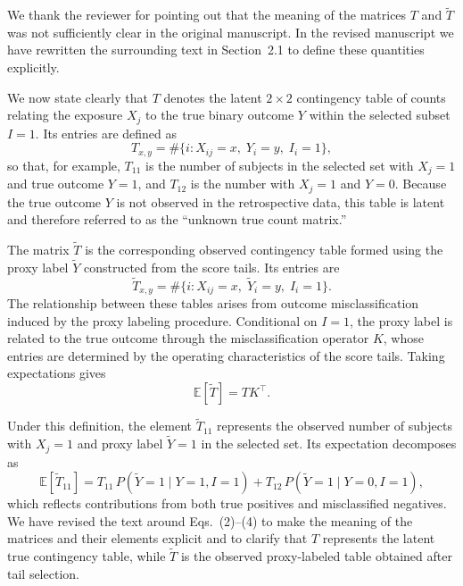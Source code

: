 \documentclass[onecolumn,11pt]{IEEEtran}
\begin{document}
We thank the reviewer for pointing out that the meaning of the matrices $T$ and $\tilde{T}$ was not sufficiently clear in the original manuscript. In the revised manuscript we have rewritten the surrounding text in Section~2.1 to define these quantities explicitly.

We now state clearly that $T$ denotes the latent $2\times2$ contingency table of counts relating the exposure $X_j$ to the true binary outcome $Y$ within the selected subset $I=1$. Its entries are defined as
\[
T_{x,y} = \#\{i : X_{ij}=x,\; Y_i=y,\; I_i=1\},
\]
so that, for example, $T_{11}$ is the number of subjects in the selected set with $X_j=1$ and true outcome $Y=1$, and $T_{12}$ is the number with $X_j=1$ and $Y=0$. Because the true outcome $Y$ is not observed in the retrospective data, this table is latent and therefore referred to as the ``unknown true count matrix.''

The matrix $\tilde{T}$ is the corresponding observed contingency table formed using the proxy label $\tilde{Y}$ constructed from the score tails. Its entries are
\[
\tilde{T}_{x,y} = \#\{i : X_{ij}=x,\; \tilde{Y}_i=y,\; I_i=1\}.
\]
The relationship between these tables arises from outcome misclassification induced by the proxy labeling procedure. Conditional on $I=1$, the proxy label is related to the true outcome through the misclassification operator $K$, whose entries are determined by the operating characteristics of the score tails. Taking expectations gives
\[
\mathbb{E}[\tilde{T}] = T K^{\top}.
\]

Under this definition, the element $\tilde{T}_{11}$ represents the observed number of subjects with $X_j=1$ and proxy label $\tilde{Y}=1$ in the selected set. Its expectation decomposes as
\[
\mathbb{E}[\tilde{T}_{11}]
=
T_{11}\,P(\tilde{Y}=1\mid Y=1,I=1)
+
T_{12}\,P(\tilde{Y}=1\mid Y=0,I=1),
\]
which reflects contributions from both true positives and misclassified negatives. We have revised the text around Eqs.~(2)--(4) to make the meaning of the matrices and their elements explicit and to clarify that $T$ represents the latent true contingency table, while $\tilde{T}$ is the observed proxy-labeled table obtained after tail selection.

\end{document}
